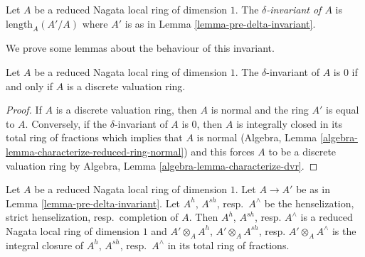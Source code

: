 \begin{definition}
\label{definition-delta-invariant-algebra}
Let $A$ be a reduced Nagata local ring of dimension $1$.
The {\it $\delta$-invariant of $A$} is $\text{length}_A(A'/A)$
where $A'$ is as in Lemma \ref{lemma-pre-delta-invariant}.
\end{definition}

\noindent
We prove some lemmas about the behaviour of this invariant.

\begin{lemma}
\label{lemma-delta-invariant-is-zero}
Let $A$ be a reduced Nagata local ring of dimension $1$.
The $\delta$-invariant of $A$ is $0$ if and only if
$A$ is a discrete valuation ring.
\end{lemma}

\begin{proof}
If $A$ is a discrete valuation ring, then $A$ is normal and
the ring $A'$ is equal to $A$. Conversely, if the
$\delta$-invariant of $A$ is $0$, then $A$ is integrally
closed in its total ring of fractions which implies that
$A$ is normal
(Algebra, Lemma \ref{algebra-lemma-characterize-reduced-ring-normal})
and this forces $A$ to be a discrete valuation ring by
Algebra, Lemma \ref{algebra-lemma-characterize-dvr}.
\end{proof}

\begin{lemma}
\label{lemma-normalization-same-after-completion}
Let $A$ be a reduced Nagata local ring of dimension $1$.
Let $A \to A'$ be as in Lemma \ref{lemma-pre-delta-invariant}.
Let $A^h$, $A^{sh}$, resp.\ $A^\wedge$
be the henselization, strict henselization, resp.\ completion of $A$.
Then $A^h$, $A^{sh}$, resp. $A^\wedge$ is a reduced Nagata local
ring of dimension $1$ and
$A' \otimes_A A^h$, $A' \otimes_A A^{sh}$, resp. $A' \otimes_A A^\wedge$
is the integral closure of $A^h$, $A^{sh}$, resp.\ $A^\wedge$
in its total ring of fractions.
\end{lemma}

